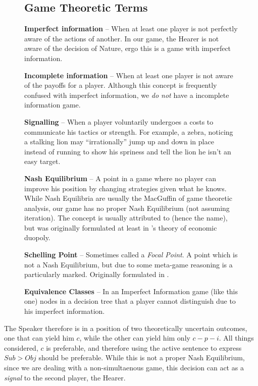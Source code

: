 \documentclass{article}
\begin{document}
\begin{figure}
\begin{shaded}
	\small
	\subsection*{Game Theoretic Terms}

	\textbf{Imperfect information} -- When at least one player is not perfectly aware of the actions of another. In our game, the Hearer is not aware of the decision of Nature, ergo this is a game with imperfect information.

	\textbf{Incomplete information} -- When at least one player is not aware of the payoffs for a player. Although this concept is frequently confused with imperfect information, we \emph{do not} have a incomplete information game.

	\textbf{Signalling} -- When a player voluntarily undergoes a costs to communicate his tactics or strength. For example, a zebra, noticing a stalking lion may ``irrationally'' jump up and down in place instead of running to show his spriness and tell the lion he isn't an easy target.

	\textbf{Nash Equilibrium} -- A point in a game where no player can improve his position by changing strategies given what he knows. While Nash Equilibria are usually the MacGuffin of game theoretic analysis, our game has no proper Nash Equilibrium (not assuming iteration). The concept is usually attributed to \textcite{nash50} (hence the name), but was originally formulated at least in \textcite{cournot38}'s theory of economic duopoly.

	\textbf{Schelling Point} -- Sometimes called a \textit{Focal Point}. A point which is not a Nash Equilibrium, but due to some meta-game reasoning is a particularly marked. Originally formulated in \textcite{schelling60}.

	\textbf{Equivalence Classes} -- In an Imperfect Information game (like this one) nodes in a decision tree that a player cannot distinguish due to his imperfect information.
\end{shaded}
\end{figure}

The Speaker therefore is in a position of two theoretically uncertain outcomes, one that can yield him $c$, while the other can yield him only $c-p-i$.
All things considered, $c$ is preferable, and therefore using the active sentence to express $Sub>Obj$ should be preferable.
While this is not a proper Nash Equilibrium, since we are dealing with a non-simultaenous game, this decision can act as a \emph{signal} to the second player, the Hearer.
\end{document}
